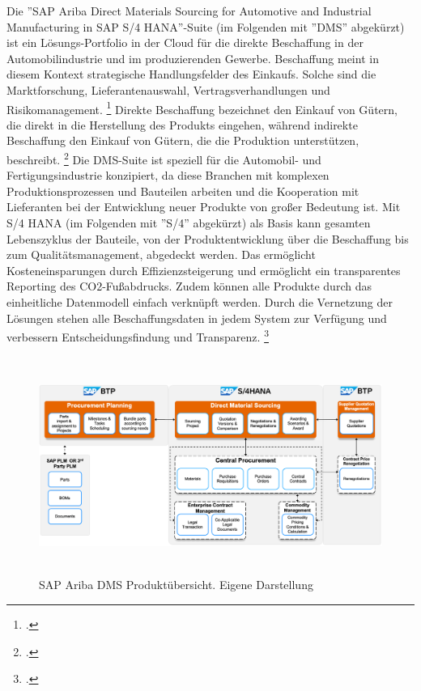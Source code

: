 Die ''SAP Ariba Direct Materials Sourcing for Automotive and Industrial Manufacturing in SAP S/4 HANA''-Suite (im Folgenden mit ''DMS'' abgekürzt) ist ein Lösungs-Portfolio in der Cloud für die direkte Beschaffung in der Automobilindustrie und im produzierenden Gewerbe. Beschaffung meint in diesem Kontext strategische Handlungsfelder des Einkaufs. Solche sind \zB die Marktforschung, Lieferantenauswahl, Vertragsverhandlungen und Risikomanagement. \footcite[Vgl.][S. 541]{theorie_digitale_transformation_beschaffung_automobilindustrie_2019} Direkte Beschaffung bezeichnet den Einkauf von Gütern, die direkt in die Herstellung des Produkts eingehen, während indirekte Beschaffung den Einkauf von Gütern, die die Produktion unterstützen, beschreibt. \footcite[Vgl.][S. 541]{theorie_digitale_transformation_beschaffung_automobilindustrie_2019} Die DMS-Suite ist speziell für die Automobil- und Fertigungsindustrie konzipiert, da diese Branchen mit komplexen Produktionsprozessen und Bauteilen arbeiten und die Kooperation mit Lieferanten bei der Entwicklung neuer Produkte von gro\ss er Bedeutung ist. Mit S/4 HANA (im Folgenden mit ''S/4'' abgekürzt) als Basis kann gesamten Lebenszyklus der Bauteile, von der Produktentwicklung über die Beschaffung bis zum Qualitätsmanagement, abgedeckt werden. Das ermöglicht Kosteneinsparungen durch Effizienzsteigerung und ermöglicht ein transparentes Reporting des CO2-Fu\ss abdrucks. Zudem können alle Produkte durch das einheitliche Datenmodell einfach verknüpft werden. Durch die Vernetzung der Lösungen stehen alle Beschaffungsdaten in jedem System zur Verfügung und verbessern Entscheidungsfindung und Transparenz. \footcite[Vgl.][]{theorie_sap_webseite_dms_übersicht_2024}

\begin{figure}[H]
    \centering
    \includegraphics[height=7.1cm]{Bilder/Direct_Material_Sourcing_Overview3.png}
    \caption[SAP Ariba DMS Suite Produktübersicht]{SAP Ariba DMS Produktübersicht. Eigene Darstellung}
    \label{fig:iso_norm}
\end{figure}

